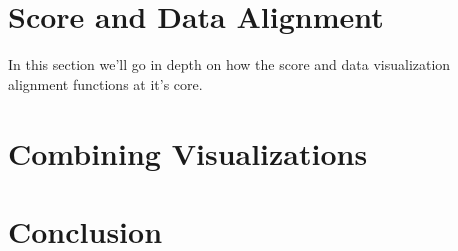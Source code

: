 \section{Score and Data Alignment}

    
In this section we'll go in depth on how the score and data visualization alignment functions at it's core. 



\section{Combining Visualizations}

\section{Conclusion}